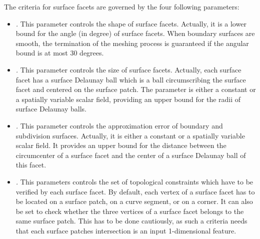 The criteria  for surface facets are governed by the four following
parameters:
%
%
%
\begin{itemize}
\item \emph{.} This parameter controls the shape of  
  surface facets. Actually, it is a lower bound for the angle (in degree) of
   surface  facets. When  boundary surfaces are smooth,  the termination  of the meshing process is
guaranteed  if the angular bound is at most 30
  degrees. 
\item \emph{.} This parameter controls the size of surface facets. 
 Actually, each surface facet has 
a surface Delaunay ball which is a ball circumscribing the surface facet and
  centered on the surface patch. The parameter  is
  either a constant or a spatially variable scalar field,  providing an 
  upper bound for the radii of surface Delaunay balls.
 \item \emph{.}  This parameter controls the approximation error of boundary and subdivision surfaces.
 Actually,   it is
  either a constant or a spatially variable scalar field. It
 provides  an upper bound for the distance between the circumcenter
 of a surface facet and the center of a surface Delaunay ball of this facet.
 \item \emph{.} This parameters controls the set of topological constraints
	which have to be verified by each surface facet. By default, each vertex of a surface
	facet has to be located on a surface patch, on a curve segment, or on a corner. It can
	also be set to check whether the three vertices of a surface facet belongs to the same
	surface patch. This has to be done cautiously, as such a criteria needs that each surface
	patches intersection is an input 1-dimensional feature.
\end{itemize}

